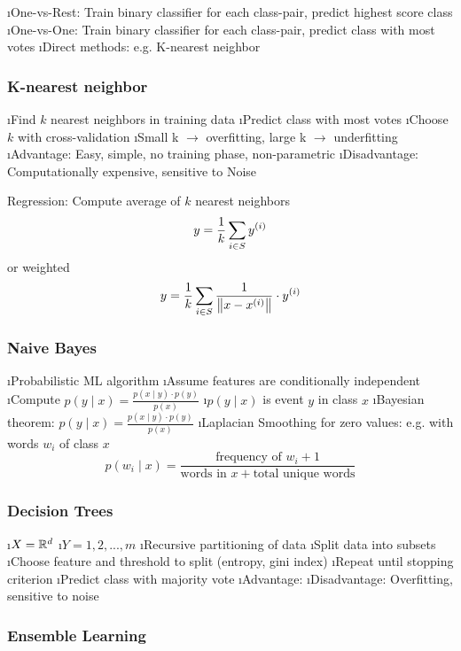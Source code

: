 \bi
\i One-vs-Rest: Train binary classifier for each class-pair, predict highest score class
\i One-vs-One: Train binary classifier for each class-pair, predict class with most votes
\i Direct methods: e.g. K-nearest neighbor 
\ei 

\subsubsection{K-nearest neighbor}

\bi
\i Find $k$ nearest neighbors in training data
\i Predict class with most votes
\i Choose $k$ with cross-validation
\i Small k $\to$ overfitting, large k $\to$ underfitting
\i Advantage: Easy, simple, no training phase, non-parametric
\i Disadvantage: Computationally expensive, sensitive to Noise
\ei

Regression: Compute average of $k$ nearest neighbors \[y = \frac{1}{k} \displaystyle\sum_{i \in S} y^{(i)}\] or weighted \[y = \frac{1}{k} \displaystyle\sum_{i \in S} \frac{1}{\left\lVert x-x^{(i)}\right\rVert} \cdot y^{(i)}\]

\subsubsection{Naive Bayes}

\bi
\i Probabilistic ML algorithm
\i Assume features are conditionally independent
\i Compute $p(y \mid x) = \frac{p(x \mid y) \cdot p(y)}{p(x)}$
\i $p(y \mid x)$ is event $y$ in class $x$
\i Bayesian theorem: $p(y \mid x) = \frac{p(x \mid y) \cdot p(y)}{p(x)}$
\i Laplacian Smoothing for zero values: e.g. with words $w_i$ of class $x$ \[
p(w_i \mid x) = \frac{\text{frequency of $w_i$} +1 }{\text{words in $x$} + \text{total unique words}}
\]
\ei

\subsubsection{Decision Trees}

\bi
\i $X = \mathbb{R}^d$
\i $Y = {1,2,...,m}$
\i Recursive partitioning of data
\i Split data into subsets
\i Choose feature and threshold to split (entropy, gini index)
\i Repeat until stopping criterion
\i Predict class with majority vote
\i Advantage:
\i Disadvantage: Overfitting, sensitive to noise
\ei

\subsubsection{Ensemble Learning}

